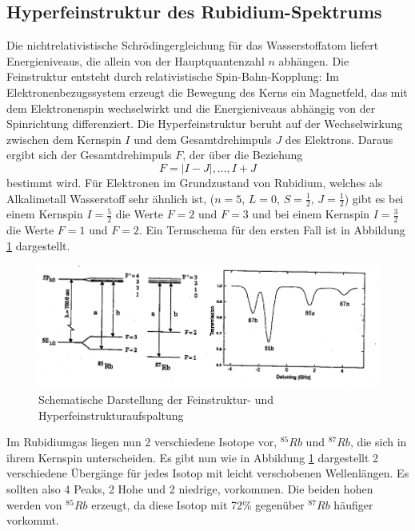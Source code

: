 \subsection{Hyperfeinstruktur des Rubidium-Spektrums}
Die nichtrelativistische Schrödingergleichung für das Wasserstoffatom liefert Energieniveaus, die allein von der Hauptquantenzahl \(n\) abhängen. Die Feinstruktur entsteht durch relativistische Spin-Bahn-Kopplung: 
Im Elektronenbezugssystem erzeugt die Bewegung des Kerns ein Magnetfeld, das mit dem Elektronenspin wechselwirkt und die Energieniveaus abhängig von der Spinrichtung differenziert.
Die Hyperfeinstruktur beruht auf der Wechselwirkung zwischen dem Kernspin \(I\) und dem Gesamtdrehimpuls \(J\) des Elektrons. Daraus ergibt sich der Gesamtdrehimpuls \(F\), der über die Beziehung 
\[
F = |I - J|, ..., I + J
\]
bestimmt wird. Für Elektronen im Grundzustand von Rubidium, welches als Alkalimetall Wasserstoff sehr ähnlich ist, (\(n=5\), \(L=0\), \(S=\frac{1}{2}\), \(J=\frac{1}{2}\)) gibt es bei einem Kernspin \(I=\frac{5}{2}\) die Werte \(F=2\) und \(F=3\)
und bei einem Kernspin \(I=\frac{3}{2}\) die Werte \(F=1\) und \(F=2\). Ein Termschema für den ersten Fall ist in Abbildung \ref{fig:Feinstruktur} dargestellt.
\begin{figure}
    \centering
    \includegraphics[width=\textwidth]{pictures/Term.png}
    \caption{Schematische Darstellung der Feinstruktur- und Hyperfeinstrukturaufspaltung}
    \label{fig:Feinstruktur}
\end{figure}
Im Rubidiumgas liegen nun 2 verschiedene Isotope vor, \(^{85}Rb\) und \(^{87}Rb\), die sich in ihrem Kernspin unterscheiden. Es gibt nun wie in 
Abbildung \ref{fig:Feinstruktur} dargestellt 2 verschiedene Übergänge für jedes Isotop mit leicht verschobenen Wellenlängen. Es sollten also 4 Peaks, 2 Hohe und 2 niedrige, vorkommen.
Die beiden hohen werden von \(^{85}Rb\) erzeugt, da diese Isotop mit 72\% gegenüber \(^{87}Rb\) häufiger vorkommt. 
